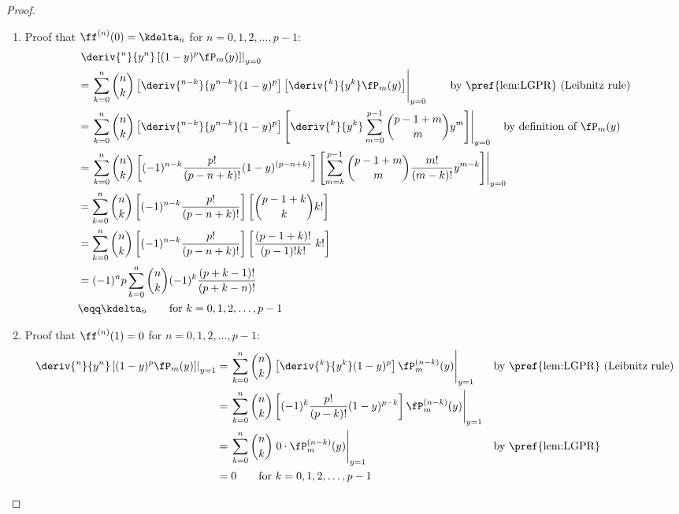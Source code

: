 \begin{proof}
\begin{enumerate}
  \item Proof that $\ff^{(n)}(0)=\kdelta_n$ for $n=0,1,2,\ldots,p-1$:
  \begin{align*}
  &\left.\deriv{^n}{y^n}\left[ (1-y)^p \fP_m(y) \right]\right|_{y=0}
  \\&= \left.
       \sum_{k=0}^n {n\choose k}
       \left[\deriv{^{n-k}}{y^{n-k}} (1-y)^p \right]
       \left[\deriv{^k}{y^k}\fP_m(y) \right]
       \right|_{y=0}
    \qquad\text{by \pref{lem:LGPR} (Leibnitz rule)}
  \\&= \left.
       \sum_{k=0}^n {n\choose k}
       \left[\deriv{^{n-k}}{y^{n-k}} (1-y)^p \right]
       \left[\deriv{^k}{y^k} \sum_{m=0}^{p-1}{p-1+m \choose m} y^m \right]
       \right|_{y=0}
    \quad\text{by definition of $\fP_m(y)$}
  \\&= \left.
       \sum_{k=0}^n {n\choose k}
       \left[(-1)^{n-k}\frac{p!}{(p-n+k)!} (1-y)^{(p-n+k)} \right]
       \left[\sum_{m=k}^{p-1}{p-1+m \choose m} \frac{m!}{(m-k)!}y^{m-k} \right]
       \right|_{y=0}
  \\&= \sum_{k=0}^n {n\choose k}
       \left[(-1)^{n-k}\frac{p!}{(p-n+k)!}\right]
       \left[{p-1+k \choose k} k! \right]
  \\&= \sum_{k=0}^n {n\choose k}
       \left[(-1)^{n-k}\frac{p!}{(p-n+k)!}\right]
       \left[\frac{(p-1+k)!}{(p-1)!k!}\; k! \right]
  \\&= (-1)^n p
       \sum_{k=0}^n {n\choose k}
       (-1)^k\frac{(p+k-1)!}{(p+k-n)!}
  \\&\eqq \kdelta_n \qquad \text{for } k=0,1,2,\ldots,p-1
  \end{align*}

  \item Proof that $\ff^{(n)}(1)=0$ for $n=0,1,2,\ldots,p-1$:
  \begin{align*}
  \left.\deriv{^n}{y^n}\left[ (1-y)^p \fP_m(y) \right]\right|_{y=1}
    &= \left.
       \sum_{k=0}^n {n\choose k}
       \left[\deriv{^k}{y^k} (1-y)^p \right]
       \fP_m^{(n-k)}(y)
       \right|_{y=1}
    && \text{by \pref{lem:LGPR} (Leibnitz rule)}
  \\&= \left.
       \sum_{k=0}^n {n\choose k}
       \left[(-1)^k\frac{p!}{(p-k)!} (1-y)^{p-k} \right]
       \fP_m^{(n-k)}(y)
       \right|_{y=1}
  \\&= \left.
       \sum_{k=0}^n {n\choose k} \; 0\cdot
       \fP_m^{(n-k)}(y)
       \right|_{y=1}
    && \text{by \pref{lem:LGPR}}
  \\&= 0 \qquad \text{for } k=0,1,2,\ldots,p-1
  \end{align*}
\end{enumerate}
\end{proof}






